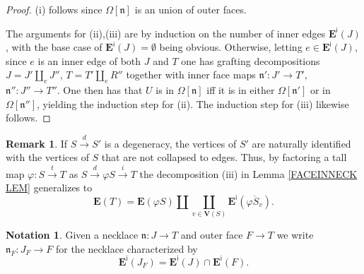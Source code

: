 \documentclass[a4paper,10pt
,draft
]{article}%
\numberwithin{equation}{section}
\numberwithin{figure}{section}
\theoremstyle{definition} %
\newtheorem{remark}[equation]{Remark}%
\newtheorem{notation}[equation]{Notation}%
\newcommand{\1}{\ensuremath{\mathbbm 1}}%
\begin{document}
\begin{proof}
	(i) follows since $\Omega[\mathfrak{n}]$ is an union of outer faces.
	
	The arguments for (ii),(iii) are by induction on the number of inner edges $\boldsymbol{E}^{\mathsf{i}}(J)$,
	with the base case of $\boldsymbol{E}^{\mathsf{i}}(J) = \emptyset$  being obvious.
%	
	Otherwise, letting $e \in \boldsymbol{E}^{\mathsf{i}}(J)$, since $e$ is an inner edge of
	both $J$ and $T$
	one has grafting decompositions
	$J = J' \amalg_e J''$,
	$T = T' \amalg_e R''$
	together with inner face maps
	$\mathfrak{n}' \colon J' \to T'$,
	$\mathfrak{n}'' \colon J'' \to T''$.
%
	One then has that 
	$U$ is in $\Omega[\mathfrak{n}]$
	iff it is in either
	$\Omega[\mathfrak{n}']$ or in $\Omega[\mathfrak{n}'']$,
	yielding the induction step for (ii).
	The induction step for (iii) likewise follows. 
\end{proof}



\begin{remark}
	If $S \xrightarrow{d} S'$
	is a degeneracy,
	the vertices of $S'$ are naturally identified with
	the vertices of $S$ that are not collapsed to edges.
	Thus, by factoring a tall map
	$\varphi \colon S \xrightarrow{t} T$ as
	$S \xrightarrow{d} \varphi S \xrightarrow{i} T$
	the decomposition (iii) in Lemma \ref{FACEINNECK LEM}
	generalizes to 
\begin{equation}\label{EDGEBREAK EQ}
	\boldsymbol{E}(T) = 
	\boldsymbol{E}(\varphi S) \amalg 
	\coprod_{v \in \boldsymbol{V}(S)}
	\boldsymbol{E}^{\mathsf{i}}(\overline{\varphi S_v}).
\end{equation}
\end{remark}



\begin{notation}
	Given a necklace
	$\mathfrak{n} \colon J \to T$
	and outer face $F \to T$
	we write 
	$\mathfrak{n}_F \colon J_F \to F$
	for the necklace characterized by
\[
	\boldsymbol{E}^{\mathsf{i}}(J_F)
	=
	\boldsymbol{E}^{\mathsf{i}}(J)
	\cap
	\boldsymbol{E}^{\mathsf{i}}(F).
\]
\end{notation}
\end{document}
